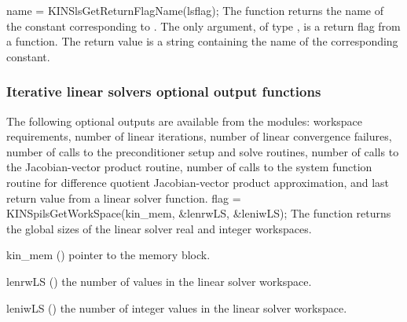 {
}
{
  name = KINSlsGetReturnFlagName(lsflag);
}
{
  The function  returns the
  name of the {\kinsls} constant corresponding to .
}
{
  The only argument, of type , is a return flag from a {\kinsls}
  function.
}
{
  The return value is a string containing the name of the corresponding constant.
}
{}

\subsubsection{Iterative linear solvers optional output functions}\label{sss:optout_spils}
The following optional outputs are available from the {\kinspils}
modules: workspace requirements, number of linear iterations, number of
linear convergence failures, number of calls to the preconditioner
setup and solve routines, number of calls to the Jacobian-vector
product routine, number of calls to the system function routine for
difference quotient Jacobian-vector product approximation, and last
return value from a linear solver function.
{
  flag = KINSpilsGetWorkSpace(kin\_mem, \&lenrwLS, \&leniwLS);
}
{
  The function  returns the global sizes of the
  linear solver real and integer workspaces.
}
{
  \begin{args}
  \item[kin\_mem] ()
    pointer to the {\kinsol} memory block.
  \item[lenrwLS] ()
    the number of  values in the linear solver workspace.
  \item[leniwLS] ()
    the number of integer values in the linear solver workspace.
  \end{args}
}
